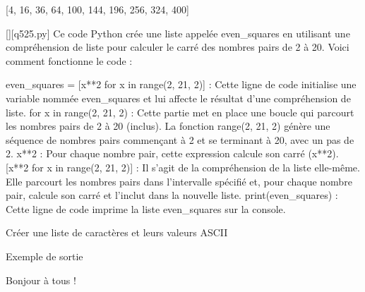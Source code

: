 [4, 16, 36, 64, 100, 144, 196, 256, 324, 400]
        \par
        \begin{solution}
            \renewcommand{\nomfichier}{q525.py}
            \pythonfile{\chemincode \nomfichier}[][\nomfichier]
            Ce code Python crée une liste appelée even\_squares en utilisant une compréhension de liste pour calculer le carré des nombres pairs de 2 à 20. Voici comment fonctionne le code :

    even\_squares = [x**2 for x in range(2, 21, 2)] : Cette ligne de code initialise une variable nommée even\_squares et lui affecte le résultat d'une compréhension de liste.
        for x in range(2, 21, 2) : Cette partie met en place une boucle qui parcourt les nombres pairs de 2 à 20 (inclus). La fonction range(2, 21, 2) génère une séquence de nombres pairs commençant à 2 et se terminant à 20, avec un pas de 2.
        x**2 : Pour chaque nombre pair, cette expression calcule son carré (x**2).
        [x**2 for x in range(2, 21, 2)] : Il s'agit de la compréhension de la liste elle-même. Elle parcourt les nombres pairs dans l'intervalle spécifié et, pour chaque nombre pair, calcule son carré et l'inclut dans la nouvelle liste.
    print(even\_squares) : Cette ligne de code imprime la liste even\_squares sur la console.
        \end{solution}
        

        \question
        Créer une liste de caractères et leurs valeurs ASCII

Exemple de sortie

Bonjour à tous !

